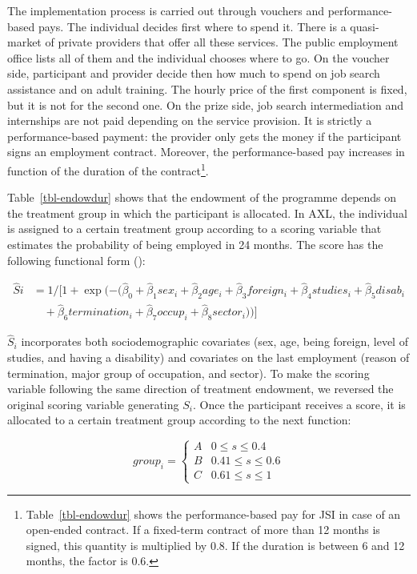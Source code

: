 \documentclass[
  11pt]{article}
\begin{document}
The implementation process is carried out through vouchers and
performance-based pays. The individual decides first where to spend it.
There is a quasi-market of private providers that offer all these
services. The public employment office lists all of them and the
individual chooses where to go. On the voucher side, participant and
provider decide then how much to spend on job search assistance and on
adult training. The hourly price of the first component is fixed, but it
is not for the second one. On the prize side, job search intermediation
and internships are not paid depending on the service provision. It is
strictly a performance-based payment: the provider only gets the money
if the participant signs an employment contract. Moreover, the
performance-based pay increases in function of the duration of the
contract\footnote{Table~\ref{tbl-endowdur} shows the performance-based
  pay for JSI in case of an open-ended contract. If a fixed-term
  contract of more than 12 months is signed, this quantity is multiplied
  by 0.8. If the duration is between 6 and 12 months, the factor is 0.6.}.

Table~\ref{tbl-endowdur} shows that the endowment of the programme
depends on the treatment group in which the participant is allocated. In
AXL, the individual is assigned to a certain treatment group according
to a scoring variable that estimates the probability of being employed
in 24 months. The score has the following functional form
():

\[
\begin{aligned}
\hat{S} i &= 1/[1 + \exp(-(\hat{\beta}_0 + \hat{\beta}_1 sex_i + \hat{\beta}_2 age_i + \hat{\beta}_3 foreign_i + \hat{\beta}_4 studies_i + \hat{\beta}_5 disab_i \\
&\quad + \hat{\beta}_6 termination_i + \hat{\beta}_7 occup_i + \hat{\beta}_8 sector_i))]
\end{aligned}
\]

\(\hat{S}_i\) incorporates both sociodemographic covariates (sex, age,
being foreign, level of studies, and having a disability) and covariates
on the last employment (reason of termination, major group of
occupation, and sector). To make the scoring variable following the same
direction of treatment endowment, we reversed the original scoring
variable generating \(S_i\). Once the participant receives a score, it
is allocated to a certain treatment group according to the next
function:

\[
group_i =
\begin{cases}
A & 0 \le s \le 0.4 \\
B & 0.41 \le s \le 0.6 \\
C & 0.61 \le s \le 1
\end{cases}
\]
\end{document}
